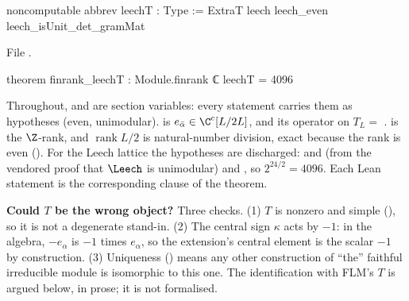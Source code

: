 \begin{leancode}
noncomputable abbrev leechT : Type := ExtraT leech leech_even leech_isUnit_det_gramMat
\end{leancode}
\noindent File .
\begin{leancode}
theorem finrank_leechT : Module.finrank ℂ leechT = 4096
\end{leancode}
\begin{dictionary}
Throughout,  and  are section variables:
every statement carries them as hypotheses (even, unimodular).   is
$e_{\bar\alpha}\in\C^c[L/2L]$, and  its operator on $T_L=$ .
 is the $\Z$-rank, and $\operatorname{rank}L/2$ is natural-number division, exact
because the rank is even ().  For the Leech lattice the hypotheses
are discharged:  and  (from the vendored proof that
$\Leech$ is unimodular) and , so $2^{24/2}=4096$.  Each Lean
statement is the corresponding clause of the theorem.

\textbf{Could $T$ be the wrong object?}  Three checks.  (1) $T$ is nonzero and simple
(), so it is not a degenerate stand-in.  (2) The central sign
$\kappa$ acts by $-1$: in the algebra, $-e_\alpha$ is $-1$ times $e_\alpha$, so the extension's
central element is the scalar $-1$ by construction.  (3) Uniqueness
() means any other construction of ``the'' faithful irreducible
module is isomorphic to this one.  The identification with FLM's $T$ is argued below, in prose; it
is not formalised.
\end{dictionary}

